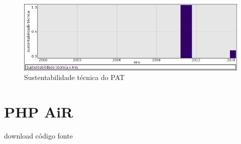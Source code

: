\begin{figure}[h]
  \center
  \includegraphics[scale=0.50]{imagens/softwares-charts/pat.png}
  \caption{Sustentabilidade técnica do PAT}
\end{figure}


\section{PHP AiR}
\checkmark download
\checkmark código fonte


